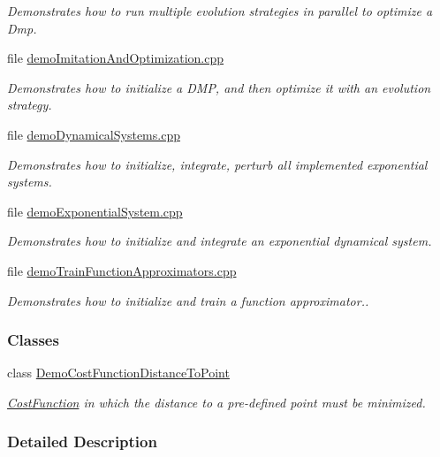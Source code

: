 \begin{DoxyCompactItemize}
\begin{DoxyCompactList}\small\item\em Demonstrates how to run multiple evolution strategies in parallel to optimize a Dmp. \end{DoxyCompactList}\item 
file \hyperlink{demoImitationAndOptimization_8cpp}{demo\+Imitation\+And\+Optimization.\+cpp}
\begin{DoxyCompactList}\small\item\em Demonstrates how to initialize a D\+M\+P, and then optimize it with an evolution strategy. \end{DoxyCompactList}\item 
file \hyperlink{demoDynamicalSystems_8cpp}{demo\+Dynamical\+Systems.\+cpp}
\begin{DoxyCompactList}\small\item\em Demonstrates how to initialize, integrate, perturb all implemented exponential systems. \end{DoxyCompactList}\item 
file \hyperlink{demoExponentialSystem_8cpp}{demo\+Exponential\+System.\+cpp}
\begin{DoxyCompactList}\small\item\em Demonstrates how to initialize and integrate an exponential dynamical system. \end{DoxyCompactList}\item 
file \hyperlink{demoTrainFunctionApproximators_8cpp}{demo\+Train\+Function\+Approximators.\+cpp}
\begin{DoxyCompactList}\small\item\em Demonstrates how to initialize and train a function approximator.. \end{DoxyCompactList}\end{DoxyCompactItemize}
\subsubsection*{Classes}
\begin{DoxyCompactItemize}
\item 
class \hyperlink{classDmpBbo_1_1DemoCostFunctionDistanceToPoint}{Demo\+Cost\+Function\+Distance\+To\+Point}
\begin{DoxyCompactList}\small\item\em \hyperlink{classDmpBbo_1_1CostFunction}{Cost\+Function} in which the distance to a pre-\/defined point must be minimized. \end{DoxyCompactList}\end{DoxyCompactItemize}


\subsubsection{Detailed Description}
